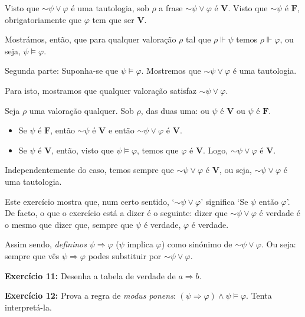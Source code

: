 \documentclass{article}
\theoremstyle{definition}
\theoremstyle{remark}
\newcommand{\V}{\mathbf{V}}
\newcommand{\F}{\mathbf{F}}
\newcommand*{\lneg}{\mathord{\sim}}
\begin{document}
	Visto que $\lneg \psi \lor \varphi$ é uma tautologia, sob $\rho$ a frase $\lneg \psi \lor \varphi$ é $\V$. Visto que $\lneg \psi$ é $\F$, obrigatoriamente que $\varphi$ tem que ser $\V$.
	
	Mostrámos, então, que para qualquer valoração $\rho$ tal que $\rho \Vdash \psi$ temos $\rho \Vdash \varphi$, ou seja, $\psi \vDash \varphi$.
	
	\smallskip
	
	Segunda parte: Suponha-se que $\psi \vDash \varphi$. Mostremos que $\lneg \psi \lor \varphi$ é uma tautologia.
	
	Para isto, mostramos que qualquer valoração satisfaz $\lneg \psi \lor \varphi$.
	
	Seja $\rho$ uma valoração qualquer. Sob $\rho$, das duas uma: ou $\psi$ é $\V$ ou $\psi$ é $\F$.
	
	\begin{itemize}	
	\item Se $\psi$ é $\F$, então $\lneg \psi$ é $\V$ e então $\lneg \psi \lor \varphi$ é $\V$.
	
	\item Se $\psi$ é $\V$, então, visto que $\psi \vDash \varphi$, temos que $\varphi$ é $\V$. Logo, $\lneg \psi \lor \varphi$ é $\V$.
	\end{itemize}
	
	Independentemente do caso, temos sempre que $\lneg \psi \lor \varphi$ é $\V$, ou seja, $\lneg \psi \lor \varphi$ é uma tautologia.
	
	\medskip
	
	Este exercício mostra que, num certo sentido, `$\lneg \psi \lor \varphi$' significa `Se $\psi$ então $\varphi$'. De facto, o que o exercício está a dizer é o seguinte: dizer que $\lneg \psi \lor \varphi$ é verdade é o mesmo que dizer que, sempre que $\psi$ é verdade, $\varphi$ é verdade.
	
	 Assim sendo, \emph{defininos} $\psi \Rightarrow \varphi$ ($\psi$ implica $\varphi$) como sinónimo de $\lneg \psi \lor \varphi$. Ou seja: sempre que vês $\psi \Rightarrow \varphi$ podes substituir por $\lneg \psi \lor \varphi$.
	
	\textbf{Exercício 11:} Desenha a tabela de verdade de $a \Rightarrow b$.
	
	\smallskip
	
	\textbf{Exercício 12:} Prova a regra de \textit{modus ponens}: $(\psi \Rightarrow \varphi) \land \psi \vDash \varphi$. Tenta interpretá-la.
	
	\smallskip
	
\end{document}
